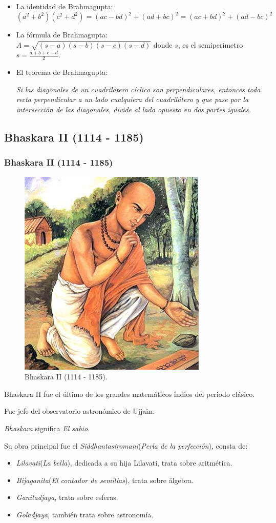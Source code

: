 \documentclass[compress, aspectratio=169]{beamer} %
\begin{document}
		\begin{frame}
			\begin{itemize}
				\item La identidad de Brahmagupta:
				$$ (a^2 + b^2)(c^2 + d^2) =(ac - bd)^2 + (ad + bc)^2 = (ac + bd)^2 + (ad-bc)^2$$
				\item La fórmula de Brahmagupta: \\
				$\displaystyle A = \sqrt{(s - a)(s - b)(s - c)(s - d)}$ donde $s$, es el semiperímetro $\displaystyle
				s = \frac {a + b + c + d}{2}$. 
				\item El teorema de Brahmagupta:
				\begin{center}
					\em Si las diagonales de un cuadrilátero cíclico son perpendiculares, entonces toda recta perpendicular
					a un lado cualquiera del cuadrilátero y que pase por la intersección de las diagonales, divide al lado
					opuesto en dos partes iguales.
				\end{center}
			\end{itemize}
		\end{frame}

	\subsection{Bhaskara II (1114 - 1185)}
		\begin{frame}
			\frametitle{Bhaskara II (1114 - 1185)}
			\begin{figure}
				\centering
				\includegraphics[width = .3\linewidth]{bhaskara_II.jpg}
				\caption{Bhaskara II (1114 - 1185).}
			\end{figure}
		\end{frame}
		
		\begin{frame}
			Bhaskara II fue el último de los grandes matemáticos indios del periodo clásico.
			
			Fue jefe del observatorio astronómico de Ujjain.
			
			\textit{Bhaskara} significa \textit{El sabio}.

			Su obra principal fue el \textit{Siddhantasiromani}(\textit{Perla de la perfección}), consta de:
			\begin{itemize}
				\item \textit{Lilavati}(\textit{La bella}), dedicada a su hija Lilavati, trata sobre aritmética.
				\item \textit{Bijaganita}(\textit{El contador de semillas}), trata sobre álgebra.
				\item \textit{Ganitadjaya}, trata sobre esferas.
				\item \textit{Goladjaya}, también trata sobre astronomía.
			\end{itemize}
		\end{frame}	
\end{document}
